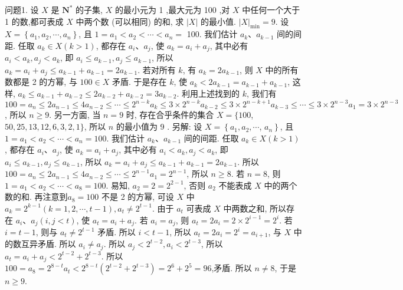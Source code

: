 
问题1. 设 $X$ 是 $\mathbf{N}^*$ 的子集, $X$ 的最小元为 1 ,最大元为 100 ,对 $X$ 中任何一个大于 1 的数,都可表成 $X$ 中两个数 (可以相同) 的和, 求 $|X|$ 的最小值.
$|X|_{\min }=9$. 设 $X=\left\{a_1, a_2, \cdots, a_n\right\}$, 且 $1=a_1<a_2<\cdots<a_n=$ 100. 我们估计 $a_k 、 a_{k-1}$ 间的间距.
任取 $a_k \in X(k>1)$, 都存在 $a_i 、 a_j$, 使 $a_k=a_i+a_j$, 其中必有 $a_i<a_k, a_j<a_k$, 即 $a_i \leqslant a_{k-1}, a_j \leqslant a_{k-1}$, 所以 $a_k= a_i+a_j \leqslant a_{k-1}+a_{k-1}=2 a_{k-1}$. 若对所有 $k$, 有 $a_k=2 a_{k-1}$, 则 $X$ 中的所有数都是 2 的方幂, 与 $100 \in X$ 矛盾.
于是存在 $k$, 使 $a_k<2 a_{k-1}=a_{k-1}+a_{k-1}$, 这样, $a_k \leqslant a_{k-1}+a_{k-2} \leqslant 2 a_{k-2}+a_{k-2}=3 a_{k-2}$. 利用上述找到的 $k$, 我们有 $100=a_n \leqslant 2 a_{n-1} \leqslant 4 a_{n-2} \leqslant \cdots \leqslant 2^{n-k} a_k \leqslant 3 \times 2^{n-k} a_{k-2} \leqslant 3 \times 2^{n-k+1} a_{k-3} \leqslant \cdots \leqslant 3 \times 2^{n-3} a_1= 3 \times 2^{n-3}$, 所以 $n \geqslant 9$. 另一方面, 当 $n=9$ 时, 存在合乎条件的集合 $X=\{100$, $50,25,13,12,6,3,2,1\}$, 所以 $n$ 的最小值为 9 . 另解: 设 $X=\left\{a_1, a_2, \cdots\right.$, $\left.a_n\right\}$, 且 $1=a_1<a_2<\cdots<a_n=100$. 我们估计 $a_k 、 a_{k-1}$ 间的间距.
任取 $a_k \in X(k>1)$, 都存在 $a_i 、 a_j$, 使 $a_k=a_i+a_j$, 其中必有 $a_i<a_k, a_j<a_k$, 即 $a_i \leqslant a_{k-1}, a_j \leqslant a_{k-1}$, 所以 $a_k=a_i+a_j \leqslant a_{k-1}+a_{k-1}=2 a_{k-1}$. 所以 $100=a_n \leqslant 2 a_{n-1} \leqslant 4 a_{n-2} \leqslant \cdots \leqslant 2^{n-1} a_1=2^{n-1}$, 所以 $n \geqslant 8$. 若 $n=8$, 则 $1=a_1<a_2<\cdots< a_8=100$. 易知, $a_2=2=2^{2-1}$, 否则 $a_2$ 不能表成 $X$ 中的两个数的和.
再注意到$a_8=100$ 不是 2 的方幂, 可设 $X$ 中 $a_k=2^{k-1}(k=1,2, \cdots, t-1), a_t \neq 2^{t-1}$. 由于 $a_t$ 可表成 $X$ 中两数之和, 所以存在 $a_i 、 a_j(i, j<t)$, 使 $a_t=a_i+a_j$. 若 $a_i=a_j$, 则 $a_t=2 a_i=2 \times 2^{i-1}=2^i$. 若 $i=t-1$, 则与 $a_t \neq 2^{t-1}$ 矛盾.
所以 $i< t-1$, 所以 $a_t=2 a_i=2^i=a_{i+1}$, 与 $X$ 中的数互异矛盾.
所以 $a_i \neq a_j$. 所以 $a_j<2^{t-2}, a_i<2^{t-3}$, 所以 $a_t=a_i+a_j<2^{t-2}+2^{t-3}$. 所以 $100=a_8=2^{8-t} a_t< 2^{8-t}\left(2^{t-2}+2^{t-3}\right)=2^6+2^5=96$,矛盾.
所以 $n \neq 8$, 于是 $n \geqslant 9$.



